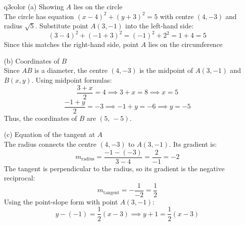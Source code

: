 \documentclass[11pt,a4paper]{article}
\begin{document}
\begin{ansbox}{q3color}
(a) Showing $A$ lies on the circle\\[4pt]
The circle has equation $(x-4)^2 + (y+3)^2 = 5$ with centre $(4,-3)$ and radius $\sqrt{5}$. Substitute point $A(3,-1)$ into the left-hand side:
\[
(3-4)^2 + (-1+3)^2 = (-1)^2 + 2^2 = 1 + 4 = 5
\]
Since this matches the right-hand side, point $A$ lies on the circumference \quad {}

(b) Coordinates of $B$\\[4pt]
Since $AB$ is a diameter, the centre $(4,-3)$ is the midpoint of $A(3,-1)$ and $B(x, y)$. Using midpoint formulas:
\[
\frac{3+x}{2} = 4 \implies 3+x = 8 \implies x = 5
\]
\[
\frac{-1+y}{2} = -3 \implies -1+y = -6 \implies y = -5
\]
Thus, the coordinates of $B$ are $\boxed{(5,\,-5)}$.

(c) Equation of the tangent at $A$\\[4pt]
The radius connects the centre $(4,-3)$ to $A(3,-1)$. Its gradient is:
\[
m_{\text{radius}} = \frac{-1 - (-3)}{3 - 4} = \frac{2}{-1} = -2
\]
The tangent is perpendicular to the radius, so its gradient is the negative reciprocal:
\[
m_{\text{tangent}} = -\frac{1}{-2} = \frac{1}{2}
\]
Using the point-slope form with point $A(3,-1)$:
\[
y - (-1) = \frac{1}{2}(x - 3) \implies \boxed{y + 1 = \frac{1}{2}(x - 3)}
\]
\end{ansbox}
\end{document}
